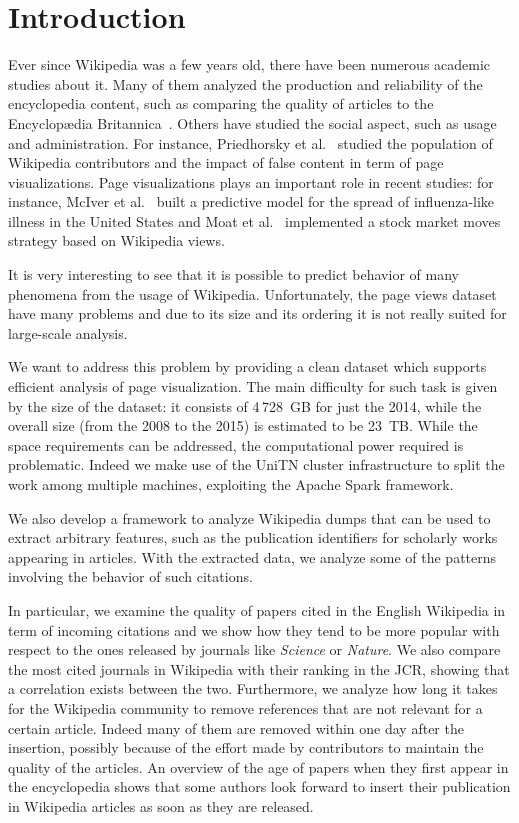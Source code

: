 
\chapter*{Introduction} %
\label{introduction}
Ever since Wikipedia was a few years old, there have been numerous academic studies about it.
Many of them analyzed the production and reliability of the encyclopedia content, such as comparing the quality of articles to the Encyclopædia Britannica~\cite{Giles2005}.
Others have studied the social aspect, such as usage and administration.
For instance, Priedhorsky et al.~\cite{Priedhorsky2007} studied the population of Wikipedia contributors and the impact of false content in term of page visualizations.
Page visualizations plays an important role in recent studies:
for instance, McIver et al.~\cite{McIver2014} built a predictive model for the spread of influenza-like illness in the United States and Moat et al.~\cite{Moat2013} implemented a stock market moves strategy based on Wikipedia views.

It is very interesting to see that it is possible to predict behavior of many phenomena from the usage of Wikipedia.
Unfortunately, the page views dataset have many problems and due to its size and its ordering it is not really suited for large-scale analysis.

We want to address this problem by providing a clean dataset which supports efficient analysis of page visualization.
The main difficulty for such task is given by the size of the dataset: it consists of 4\,728~GB for just the 2014, while the overall size (from the 2008 to the 2015) is estimated to be 23~TB.
While the space requirements can be addressed, the computational power required is problematic.
Indeed we make use of the UniTN cluster infrastructure to split the work among multiple machines, exploiting the Apache Spark framework.

We also develop a framework to analyze Wikipedia dumps that can be used to extract arbitrary features, such as the publication identifiers for scholarly works appearing in articles.
With the extracted data, we analyze some of the patterns involving the behavior of such citations.

In particular, we examine the quality of papers cited in the English Wikipedia in term of incoming citations and we show how they tend to be more popular with respect to the ones released by journals like \emph{Science} or \emph{Nature}.
We also compare the most cited journals in Wikipedia with their ranking in the \ac{JCR}, showing that a correlation exists between the two.
Furthermore, we analyze how long it takes for the Wikipedia community to remove references that are not relevant for a certain article.
Indeed many of them are removed within one day after the insertion, possibly because of the effort made by contributors to maintain the quality of the articles.
An overview of the age of papers when they first appear in the encyclopedia shows that some authors look forward to insert their publication in Wikipedia articles as soon as they are released.


